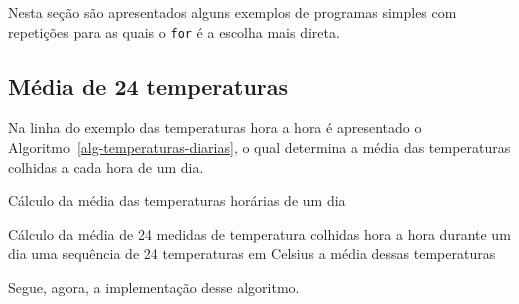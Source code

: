 \documentclass[
  11pt,
  a4paper,
]{scrbook}
\begin{document}
Nesta seção são apresentados alguns exemplos de programas simples com
repetições para as quais o \texttt{for} é a escolha mais direta.

\subsection{Média de 24 temperaturas}\label{muxe9dia-de-24-temperaturas}

Na linha do exemplo das temperaturas hora a hora é apresentado o
Algoritmo~\ref{alg-temperaturas-diarias}, o qual determina a média das
temperaturas colhidas a cada hora de um dia.

\begin{algorithm}[H]
\caption{\label{alg-temperaturas-diarias}Cálculo da média das
temperaturas horárias de um dia}
\begingroup%


\begin{algorithmic}
    \Description Cálculo da média de 24 medidas de temperatura colhidas hora a hora durante um dia
    \Require uma sequência de 24 temperaturas em Celsius
    \Ensure a média dessas temperaturas
    \Statex{}
    \EndFor
\end{algorithmic}

\endgroup
\end{algorithm}

Segue, agora, a implementação desse algoritmo.
\end{document}
